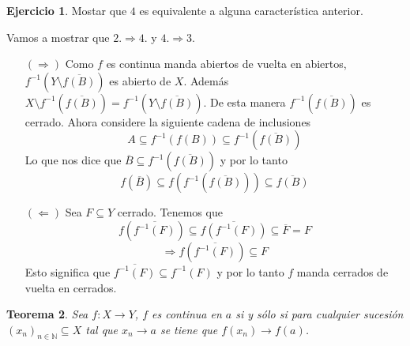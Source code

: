 \documentclass[12pt]{article}
\theoremstyle{plain}
\newtheorem{Th}{Teorema}[subsection]   %
\theoremstyle{definition}
\newtheorem{Ej}[Th]{Ejercicio}
\theoremstyle{remark}
\numberwithin{equation}{section}
\newcommand{\bN}{\mathbb{N}}        %
\renewcommand{\:}{\colon}           %
\begin{document}
\begin{multicols}{2}
\begin{Ej}
  Mostar que $\mathit{4}$ es equivalente a alguna característica anterior.
\end{Ej}
\begin{ptcb}
Vamos a mostrar que $\mathit{2}.\Rightarrow\mathit{4}.$ y $\mathit{4}.\Rightarrow\mathit{3}.$
\begin{enumerate}
  \item[$(\Rightarrow)$] Como $f$ es continua manda abiertos de vuelta en abiertos,  $f^{-1}(Y\setminus \overline{f(B)})$ es abierto de $X$. Además $X\setminus f^{-1}(\overline{f(B)})=f^{-1}(Y\setminus \overline{f(B)})$. De esta manera $f^{-1}(\overline{f(B)})$ es cerrado. Ahora considere la siguiente cadena de inclusiones
      $$A\subseteq f^{-1}(f(B))\subseteq f^{-1}(\overline{f(B)})$$
      Lo que nos dice que $\overline{B}\subseteq f^{-1}(\overline{f(B)})$ y por lo tanto
      $$f(\overline{B})\subseteq f(f^{-1}(\overline{f(B)}))\subseteq\overline{f(B)} $$
  \item[$(\Leftarrow)$] Sea $F\subseteq Y$ cerrado. Tenemos que
  $$f(\overline{f^{-1}(F)}) \subseteq \overline{f(f^{-1}(F))} \subseteq \overline{F} = F$$
  $$\Rightarrow f(\overline{f^{-1}(F)}) \subseteq F$$
  Esto significa que $\overline{f^{-1}(F)}\subseteq f^{-1}(F)$ y por lo tanto $f$ manda cerrados de vuelta en cerrados.
\end{enumerate}
\end{ptcb}
\begin{Th}
  Sea $f\colon X\to Y$, $f$ es continua en $a$ si y sólo si para cualquier sucesión $(x_n)_{n\in\bN}\subseteq X$ tal que $x_n\to a$ se tiene que $f(x_n)\to f(a)$.
\end{Th}


\end{multicols}
\end{document}
